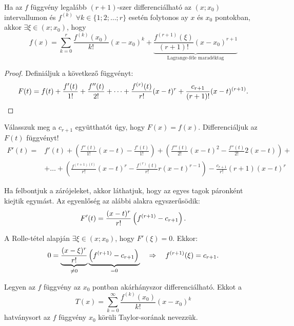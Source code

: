\begin{theorem}
  Ha az $f$ függvény legalább $(r + 1)$-szer differenciálható az $(x; x_0)$
  intervallumon és $f^{(k)}$ $\forall k \in \{1;2;\dots;r\}$ esetén folytonos
  ay $x$ és $x_0$ pontokban, akkor $\exists \xi \in (x; x_0)$, hogy
  $$
    f(x)
    = \sum_{k=0}^{r} \frac{f^{(k)}(x_0)}{k!} (x - x_0)^k
    + \underbrace{\frac{f^{(r+1)}(\xi)}{(r+1)!} (x - x_0)^{r+1}}_{\text{Lagrange-féle maradéktag}}
  $$

  \begin{proof}
    Definiáljuk a következő függvényt:
    $$
      F(t)
      = f(t)
      + \frac{f'(t)}{1!}
      + \frac{f''(t)}{2!}
      + \dots
      + \frac{f^{(r)}(t)}{r!} (x - t)^r
      + \frac{c_{r+1}}{(r+1)!} (x-t)^{(r+1)}
      \text.
    $$
  \end{proof}

  Válasszuk meg a $c_{r+1}$ együtthatót úgy, hogy $F(x) = f(x)$. Differenciáljuk
  az $F(t)$ függvényt!
  \begin{align*}
    F'(t)
    = & f'(t)
    + \left( \frac{f''(t)}{1!}(x - t) - \frac{f'(t)}{1!} \right)
    + \left( \frac{f'''(t)}{2!}(x - t)^2 - \frac{f''(t)}{2!} 2 (x - t) \right)
    +
    \\
      & + \dots
    + \left( \frac{f^{(r + 1)(t)}}{r!}(x - t)^r - \frac{f^{(r)}(t)}{r!} r (x-t)^{r-1} \right)
    - \frac{c_{r+1}}{r!} (r + 1) (x - t)^{r}
  \end{align*}

  Ha felbontjuk a zárójeleket, akkor láthatjuk, hogy az egyes tagok páronként
  kiejtik egymást. Az egyenlőség az alábbi alakra egyszerűsödik:
  $$
    F'(t) = \frac{(x - t)^r}{r!} \left( f^{(r + 1)} - c_{r + 1} \right)
    \text.
  $$

  A Rolle-tétel alapján $\exists \xi \in (x; x_0)$, hogy $F'(\xi) = 0$. Ekkor:
  $$
    0
    = \underbrace{\frac{(x - \xi)^r}{r!}}_{\neq 0}
    \underbrace{\left( f^{(r + 1)} - c_{r + 1} \right)\vphantom{\frac12}}_{= 0}
    \quad \Rightarrow \quad
    f^{(r + 1)}(\xi) = c_{r + 1}
    \text.
  $$
\end{theorem}

\begin{definition}
  Legyen az $f$ függvény az $x_0$ pontban akárhányszor differenciálható. Ekkot a
  $$
    T(x) = \sum_{k=0}^{\infty} \frac{f^{(k)}(x_0)}{k!} (x - x_0)^k
  $$
  hatványsort az $f$ függvény $x_0$ körüli Taylor-sorának nevezzük.
\end{definition}

